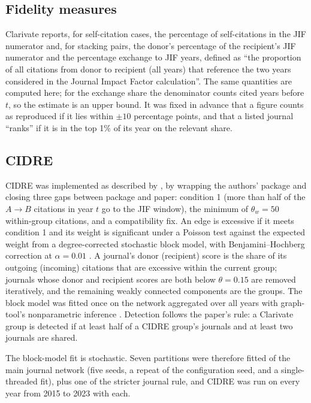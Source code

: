 \subsection{Fidelity measures}
Clarivate reports, for self-citation cases, the percentage of self-citations in the JIF numerator and, for stacking
pairs, the donor's percentage of the recipient's JIF numerator and the percentage exchange to JIF years, defined as
``the proportion of all citations from donor to recipient (all years) that reference the two years considered in the
Journal Impact Factor calculation''. The same quantities are computed here; for the exchange share the denominator counts
cited years before $t$, so the estimate is an upper bound. It was fixed in advance that a figure counts as reproduced if it lies within $\pm10$ percentage points,
and that a listed journal ``ranks'' if it is in the top 1\% of its year on the relevant share.

\subsection{CIDRE}
CIDRE was implemented as described by \citet{kojaku2021cidre}, by wrapping the authors' package and closing
three gaps between package and paper: condition 1 (more than half of the $A\!\to\!B$ citations in year $t$ go to the
JIF window), the minimum of $\theta_w=50$ within-group citations, and a compatibility fix. An edge is excessive if it
meets condition 1 and its weight is significant under a Poisson test against the expected weight from a
degree-corrected stochastic block model, with Benjamini--Hochberg correction at $\alpha=0.01$
\citep{benjamini1995}. A journal's donor (recipient) score is the share of its outgoing (incoming) citations that are
excessive within the current group; journals whose donor and recipient scores are both below $\theta=0.15$ are
removed iteratively, and the remaining weakly connected components are the groups. The block model was fitted once on
the network aggregated over all years with graph-tool's nonparametric inference
\citep{peixoto2017nonparametric,peixoto2014graphtool}. Detection follows the paper's rule: a Clarivate group is detected
if at least half of a CIDRE group's journals and at least two journals are shared.

The block-model fit is stochastic. Seven partitions were therefore fitted of the main journal network (five seeds, a
repeat of the configuration seed, and a single-threaded fit), plus one of the stricter journal rule, and CIDRE was run on every year from 2015 to 2023 with each.

